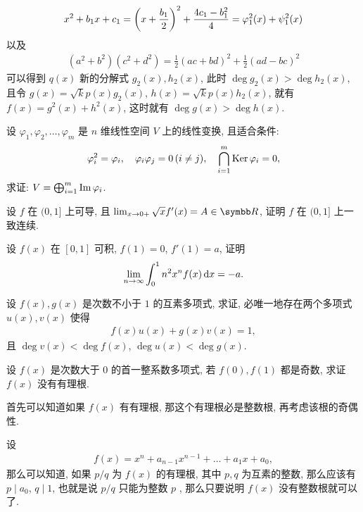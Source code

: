 \begin{exercise}[series=exer]
\begin{answer}
\begin{answersheet}
            \begin{align*}
                x^{2} + b_{1}x + c_{1} = \qty(x + \frac{b_{1}}{2})^{2} + \frac{4c_{1} - b_{1}^{2}}{4} = \varphi_{1}^{2}(x) + \psi_{1}^{2}(x)
            \end{align*}
            以及
            \begin{align*}
                (a^{2} + b^{2})(c^{2} + d^{2}) = \frac{1}{2}(ac + bd)^{2} + \frac{1}{2}(ad - bc)^{2}
            \end{align*}
            可以得到 $ q(x) $ 新的分解式 $ g_{2}(x), h_{2}(x) $, 此时 $ \deg g_{2}(x) > \deg h_{2}(x) $, 且令 $ g(x) = \sqrt{k}p(x)g_{2}(x) $, $ h(x) = \sqrt{k}p(x)h_{2}(x) $, 就有 $ f(x) = g^{2}(x) + h^{2}(x) $, 这时就有 $ \deg g(x) > \deg h(x) $. 
        \end{answersheet}
    \end{answer}
    \item 设 $ \varphi_{1}, \varphi_{2}, \dots, \varphi_{m} $ 是 $ n $ 维线性空间 $ V $ 上的线性变换, 且适合条件:
    \begin{align*}
        \varphi_{i}^{2} = \varphi_{i}, \quad \varphi_{i}\varphi_{j} = 0\,(i\ne j), \quad \bigcap_{i=1}^{m}\operatorname{Ker}\varphi_{i} = 0,
    \end{align*}
    求证: $ V = \bigoplus_{i=1}^{m}\operatorname{Im}\varphi_{i} $. 
    \item 设 $ f $ 在 $ (0, 1] $ 上可导, 且 $ \limit{x}{0+} \sqrt{x} f'(x) = A \in \R $, 证明 $ f $ 在 $ (0, 1] $ 上一致连续. 
    \item 设 $ f(x) $ 在 $ [0, 1] $ 可积, $ f(1) = 0 $, $ f'(1) = a $, 证明
    \begin{align*}
        \lim_{n \to \infty}\int_{0}^{1}n^{2}x^{n}f(x)\dd{x} = -a.
    \end{align*}
    \item 设 $ f(x), g(x) $ 是次数不小于 $ 1 $ 的互素多项式, 求证, 必唯一地存在两个多项式 $ u(x), v(x) $ 使得
    \begin{align*}
        f(x)u(x) + g(x)v(x) = 1,
    \end{align*}
    且 $ \deg v(x) < \deg f(x) $, $ \deg u(x) < \deg g(x) $.  
    \item 设 $ f(x) $ 是次数大于 $ 0 $ 的首一整系数多项式, 若 $ f(0), f(1) $ 都是奇数, 求证 $ f(x) $ 没有有理根.
    \begin{hint}
        首先可以知道如果 $ f(x) $ 有有理根, 那这个有理根必是整数根, 再考虑该根的奇偶性. 
    \end{hint}
    \begin{answer}
        设
        \begin{align*}
            f(x) = x^{n} + a_{n - 1}x^{n - 1} + \dots + a_{1}x + a_{0},
        \end{align*}        
        那么可以知道, 如果 $ p/q $ 为 $ f(x) $ 的有理根, 其中 $ p, q $ 为互素的整数, 那么应该有 $ p \mid a_{0} $, $ q \mid 1 $, 也就是说 $ p/q $ 只能为整数 $ p $ , 那么只要说明 $ f(x) $ 没有整数根就可以了.
        

\end{answer}
\end{exercise}
